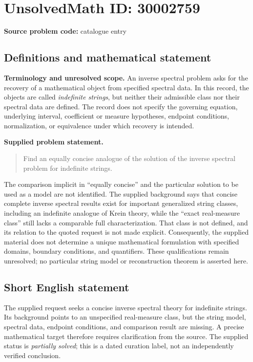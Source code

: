 \documentclass[11pt]{article}
\begin{document}
\section*{UnsolvedMath ID: 30002759}
\textbf{Source problem code:} catalogue entry
\subsection{Definitions and mathematical statement}
\textbf{Terminology and unresolved scope.} An inverse spectral problem asks for the recovery of a mathematical object from specified spectral data. In this record, the objects are called \emph{indefinite strings}, but neither their admissible class nor their spectral data are defined. The record does not specify the governing equation, underlying interval, coefficient or measure hypotheses, endpoint conditions, normalization, or equivalence under which recovery is intended.

\textbf{Supplied problem statement.}
\begin{quote}
Find an equally concise analogue of the solution of the inverse spectral problem for indefinite strings.
\end{quote}

The comparison implicit in ``equally concise'' and the particular solution to be used as a model are not identified. The supplied background says that concise complete inverse spectral results exist for important generalized string classes, including an indefinite analogue of Krein theory, while the ``exact real-measure class'' still lacks a comparable full characterization. That class is not defined, and its relation to the quoted request is not made explicit. Consequently, the supplied material does not determine a unique mathematical formulation with specified domains, boundary conditions, and quantifiers. These qualifications remain unresolved; no particular string model or reconstruction theorem is asserted here.
\subsection{Short English statement}
The supplied request seeks a concise inverse spectral theory for indefinite strings. Its background points to an unspecified real-measure class, but the string model, spectral data, endpoint conditions, and comparison result are missing. A precise mathematical target therefore requires clarification from the source. The supplied status is \emph{partially solved}; this is a dated curation label, not an independently verified conclusion.
\end{document}
